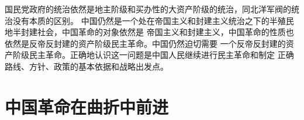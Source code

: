 \documentclass[10pt, UTF8]{ctexbook} %
\begin{document}
国民党政府的统治依然是地主阶级和买办性的大资产阶级的统治，同北洋军阀的统治没有本质的区别。
中国仍然是一个处在帝国主义和封建主义统治之下的半殖民地半封建社会，中国革命的对象依然是
帝国主义和封建主义，中国革命的性质也依然是反帝反封建的资产阶级民主革命。中国仍然迫切需要
一个反帝反封建的资产阶级民主革命。正确地认识这一问题是中国人民继续进行民主革命和制定
正确路线、方针、政策的基本依据和战略出发点。








\section{中国革命在曲折中前进}
\end{document}
